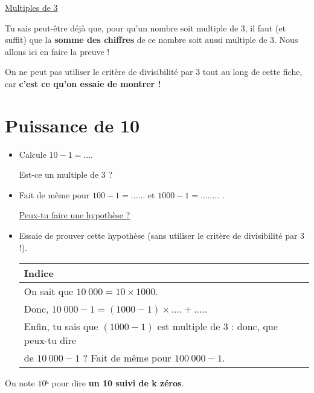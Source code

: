 \documentclass[a4paper,11pt]{article}
\begin{document}
\begin{center}
	\LARGE

	\uline{Multiples de 3}
\end{center}

Tu sais peut-être déjà que, pour qu'un nombre soit multiple de 3, il faut (et suffit) que la \textbf{somme des chiffres} de ce nombre soit aussi multiple de 3. Nous allons ici en faire la preuve !

\begin{greybox}[frametitle={Remarque :}]
	On ne peut pas utiliser le critère de divisibilité par 3 tout au long de cette fiche, car \textbf{c'est ce qu'on essaie de montrer !}
\end{greybox}

\section{Puissance de 10}

\begin{itemize}
	\item Calcule $10 - 1 = ....$

	      Est-ce un multiple de 3 ?
	\item Fait de même pour $100 - 1 = ......$ et $1000 - 1 = ........$ .

	      \uline{Peux-tu faire une hypothèse ?}
	\item Essaie de prouver cette hypothèse (sans utiliser le critère de divisibilité par 3 !).

	      \renewcommand{\arraystretch}{1.2}
	      \begin{tabular}{|l|}
		      \hline Indice                                                              \\ \hline
		      On sait que $10\ 000 = 10 × 1000$.                                         \\

		      Donc, $10\ 000 - 1 = (1000 - 1) × .... + ....$.                            \\

		      Enfin, tu sais que $(1000 - 1)$ est multiple de 3 : donc, que peux-tu dire \\ de $10\ 000 - 1$ ? Fait de même pour $100\ 000 - 1$.
		      \\ \hline
	      \end{tabular}
\end{itemize}

\begin{notation}[frametitle={Notation}]
	On note $10ᵏ$ pour dire \textbf{un 10 suivi de k zéros}.
\end{notation}
\end{document}
